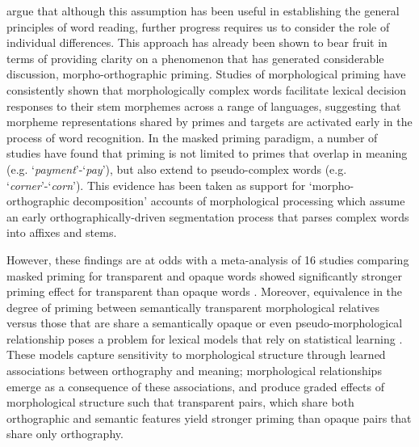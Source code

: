 \documentclass[preprint,12pt, authoryear, review]{elsarticle}
\begin{document}
{\renewcommand\&{and}\citet{andrewsMorphologicalPrimingStronger2013}} argue that although this assumption has been useful  in  establishing the general principles of word reading, further progress requires us to consider the role of individual differences.  This approach has already been shown to bear fruit in terms of providing clarity on a  phenomenon that has generated  considerable discussion, morpho-orthographic priming.  Studies of morphological priming have consistently shown that morphologically complex words facilitate lexical decision responses to their stem morphemes across a range of languages, suggesting that morpheme representations shared by primes and targets are activated early in the process of word recognition.  In the masked priming paradigm, a number of studies have found that priming is not limited to primes that overlap in meaning (e.g. `\textit{payment}'-`\textit{pay}'), but also extend to pseudo-complex words (e.g. `\textit{corner}'-`\textit{corn}').  This evidence has been taken as support for `morpho-orthographic decomposition’ accounts of morphological processing \citep{rastleBrothMyBrother2004, rastleMorphologicalDecompositionBased2008} which assume an early orthographically-driven segmentation process that parses complex words into affixes and stems.

However, these findings are at odds with a  meta-analysis of 16 studies comparing masked priming for transparent and opaque words showed significantly stronger priming effect for transparent than opaque words \citep{feldmanEarlyMorphologicalProcessing2009}. Moreover, equivalence in the degree of priming between semantically transparent morphological relatives versus those that are share a semantically opaque or even pseudo-morphological relationship poses a problem for lexical models that rely on statistical learning \citep{plautAreNonsemanticMorphological2000, baayenAmorphousModelMorphological2011}. These models capture sensitivity to morphological structure through learned associations between orthography and meaning; morphological relationships emerge as a consequence of these associations, and  produce graded effects of morphological structure such that transparent pairs, which share both orthographic and semantic features yield stronger priming than opaque pairs that share only orthography.    
\end{document}
